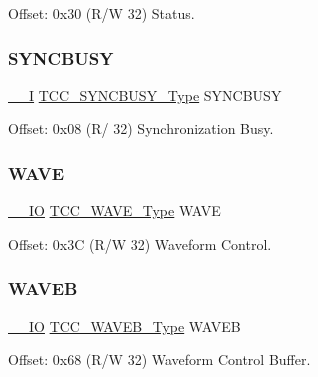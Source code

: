 Offset\+: 0x30 (R/W 32) Status. 

\mbox{\label{struct_tcc_ae9b6701602427f3812cbe1b13c368235}} 
\subsubsection{\texorpdfstring{SYNCBUSY}{SYNCBUSY}}
{\footnotesize\ttfamily \mbox{\hyperlink{core__cm0plus_8h_af63697ed9952cc71e1225efe205f6cd3}{\+\_\+\+\_\+I}} \mbox{\hyperlink{union_t_c_c___s_y_n_c_b_u_s_y___type}{T\+C\+C\+\_\+\+S\+Y\+N\+C\+B\+U\+S\+Y\+\_\+\+Type}} S\+Y\+N\+C\+B\+U\+SY}



Offset\+: 0x08 (R/ 32) Synchronization Busy. 

\mbox{\label{struct_tcc_a652764bd72a23db34e8de5af242e7d3f}} 
\subsubsection{\texorpdfstring{WAVE}{WAVE}}
{\footnotesize\ttfamily \mbox{\hyperlink{core__cm0plus_8h_aec43007d9998a0a0e01faede4133d6be}{\+\_\+\+\_\+\+IO}} \mbox{\hyperlink{union_t_c_c___w_a_v_e___type}{T\+C\+C\+\_\+\+W\+A\+V\+E\+\_\+\+Type}} W\+A\+VE}



Offset\+: 0x3C (R/W 32) Waveform Control. 

\mbox{\label{struct_tcc_a64d27160396a5a9232b4d13e0c72a632}} 
\subsubsection{\texorpdfstring{WAVEB}{WAVEB}}
{\footnotesize\ttfamily \mbox{\hyperlink{core__cm0plus_8h_aec43007d9998a0a0e01faede4133d6be}{\+\_\+\+\_\+\+IO}} \mbox{\hyperlink{union_t_c_c___w_a_v_e_b___type}{T\+C\+C\+\_\+\+W\+A\+V\+E\+B\+\_\+\+Type}} W\+A\+V\+EB}



Offset\+: 0x68 (R/W 32) Waveform Control Buffer. 

\mbox{\label{struct_tcc_aad33ead9530dfb9aeac8b4dee64007cd}} 
